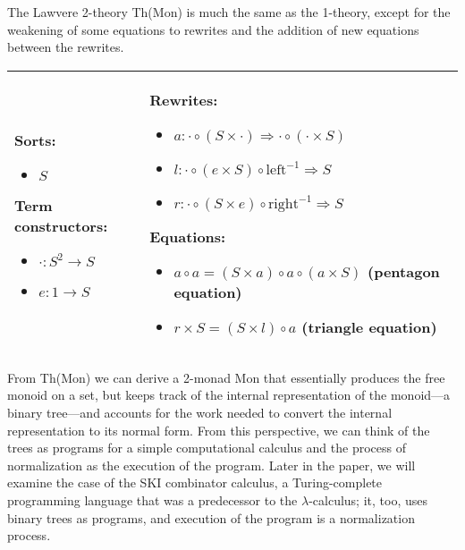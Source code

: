 \documentclass{llncs}
\newcommand{\maps}{\colon}
\renewcommand{\:}{\colon}
\newcommand{\leftu}{\mathrm{left}}
\newcommand{\rightu}{\mathrm{right}}
\begin{document}
The Lawvere 2-theory Th(Mon) is much the same as the 1-theory, except for the weakening of some equations to rewrites and the addition of new equations between the rewrites.

\begin{center}
  \begin{longtable}{|p{0.3\linewidth}|p{0.7\linewidth}|}
    \hline
    Sorts:
    \begin{itemize}
      \item $S$
    \end{itemize}
    Term constructors:
    \begin{itemize}
      \item $\cdot\maps S^2 \to S$
      \item $e\maps 1 \to S$
    \end{itemize}
    &
    Rewrites:
    \begin{itemize}
      \item $a\maps \cdot \circ (S \times \cdot) \Rightarrow \cdot \circ (\cdot \times S)$
      \item $l\maps \cdot \circ (e \times S) \circ \leftu^{-1} \Rightarrow S$
      \item $r\maps \cdot \circ (S \times e) \circ \rightu^{-1} \Rightarrow S$
    \end{itemize}
    Equations:
    \begin{itemize}
      \item $a \circ a = (S \times a) \circ a \circ (a \times S)$ (pentagon equation)
      \item $r \times S = (S \times l) \circ a$ (triangle equation)
    \end{itemize}\\
    \hline
  \end{longtable}
\end{center}
From Th(Mon) we can derive a 2-monad Mon that essentially produces the free monoid on a set, but keeps track of the internal representation of the monoid---a binary tree---and accounts for the work needed to convert the internal representation to its normal form.  From this perspective, we can think of the trees as programs for a simple computational calculus and the process of normalization as the execution of the program.  Later in the paper, we will examine the case of the SKI combinator calculus, a Turing-complete programming language that was a predecessor to the $\lambda$-calculus; it, too, uses binary trees as programs, and execution of the program is a normalization process.
\end{document}
